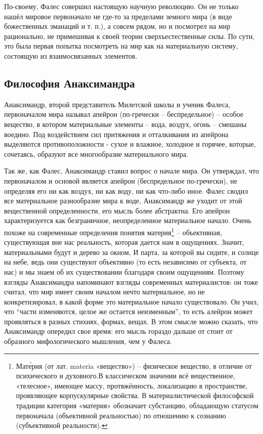 \documentclass[
]{article}
\begin{document}
По-своему, Фалес совершил настоящую научную революцию. Он не только
нашёл мировое первоначало не где-то за пределами земного мира (в виде
божественных эманаций и т. п.), а совсем рядом, но и посмотрел на мир
рационально, не примешивая к своей теории сверхъестественные силы. По
сути, это была первая попытка посмотреть на мир как на материальную
систему, состоящую из взаимосвязанных элементов.

\hypertarget{ux444ux438ux43bux43eux441ux43eux444ux438ux44f-ux430ux43dux430ux43aux441ux438ux43cux430ux43dux434ux440ux430}{%
\subsection{Философия
Анаксимандра}\label{ux444ux438ux43bux43eux441ux43eux444ux438ux44f-ux430ux43dux430ux43aux441ux438ux43cux430ux43dux434ux440ux430}}

Анаксимандр, второй представитель Милетской школы и ученик Фалеса,
первоначалом мира называл апейрон (по-гречески -- беспредельное) --
особое вещество, в котором материальные элементы -- вода, воздух, огонь
-- смешаны воедино. Под воздействием сил притяжения и отталкивания из
апейрона выделяются противоположности - сухое и влажное, холодное и
горячее, которые, сочетаясь, образуют все многообразие материального
мира.

Так же, как Фалес, Анаксимандр ставил вопрос о начале мира. Он
утверждал, что первоначалом и основой является апейрон (беспредельное
по-гречески), не определяя его ни как воздух, ни как воду, ни как
что-либо иное. Фалес сводил все материальное разнообразие мира к воде,
Анаксимандр же уходит от этой вещественной определенности, его мысль
более абстрактна. Его апейрон характеризуется как безграничное,
неопределенное материальное начало. Очень похоже на современные
определения понятия материя\footnote{Мате́рия (от лат. materia
  «вещество») -- физическое вещество, в отличие от психического и
  духовного.В классическом значении всё вещественное, «телесное»,
  имеющее массу, протяжённость, локализацию в пространстве, проявляющее
  корпускулярные свойства. В материалистической философской традиции
  категория «материя» обозначает субстанцию, обладающую статусом
  первоначала (объективной реальностью) по отношению к сознанию
  (субъективной реальности).} -- объективная, существующая вне нас
реальность, которая дается нам в ощущениях. Значит, материальными будут
и дерево за окном, И парта, за которой вы сидите, и солнце на небе, ведь
они существуют объективно (то есть независимо от субъекта, от нас) и мы
знаем об их существо­вании благодаря своим ощущениям. Поэтому взгляды
Анакси­мандра напоминают взгляды современных материалистов: он тоже
считал, что мир имеет своим началом нечто материальное, но не
конкретизировал, в какой форме это материальное начало существовало. Он
учил, что ``части изменяются, целое же остается неизменным'', то есть
алейрон может проявляться в разных стихиях, формах, вещах. В этом смысле
можно сказать, что Анаксимандр опередил свое время: его мысль гораздо
дальше от­ стоит от образного мифологического мышления, чем у Фалеса.
\end{document}
